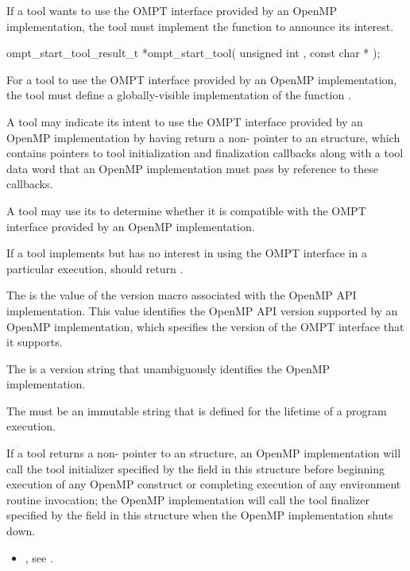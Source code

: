 \label{sec:ompt_start_tool}

\summary
If a tool wants to use the OMPT interface provided by an OpenMP implementation,
the tool must implement the function  to announce its interest.

\format

\begin{cspecific}
\begin{omptOther}
ompt_start_tool_result_t *ompt_start_tool(
  unsigned int ,
  const char *
);
\end{omptOther}
\end{cspecific}


\descr
For a tool to use the OMPT interface provided by an OpenMP implementation,
the tool must define a globally-visible implementation of the
function .

A tool may indicate its intent to use the OMPT interface provided
by an OpenMP implementation by having
 return a non- pointer to an
 structure, which contains pointers to
tool initialization and finalization callbacks along with
a tool data word that an OpenMP implementation must pass by reference
to these callbacks.

A tool may use its \callbackarg{}  to determine
whether it is compatible with the OMPT interface provided by an OpenMP
implementation.

If a tool implements  but has no interest in using
the OMPT interface in a particular execution,
 should return . 

\argdesc

The \callbackarg{}  
is the value of the  version macro 
associated with the OpenMP API implementation. This value 
identifies the OpenMP API version supported by an OpenMP implementation,
which specifies the version of the OMPT interface that it supports.

The \callbackarg{} 
is a version string that unambiguously identifies the OpenMP implementation.

\constraints

The \callbackarg{}  must be
an immutable string that is defined for the lifetime of a program
execution.

\effect
If a tool returns a non- pointer to an
 structure,
an OpenMP implementation will call the tool initializer specified by the
 field in this structure before
beginning execution of any OpenMP construct
or completing execution of any environment routine invocation; the
OpenMP implementation will call the tool finalizer specified by the
 field in this structure when the OpenMP
implementation shuts down.



\crossreferences
\begin{itemize}
    \item {}, see 
     .
\end{itemize}

